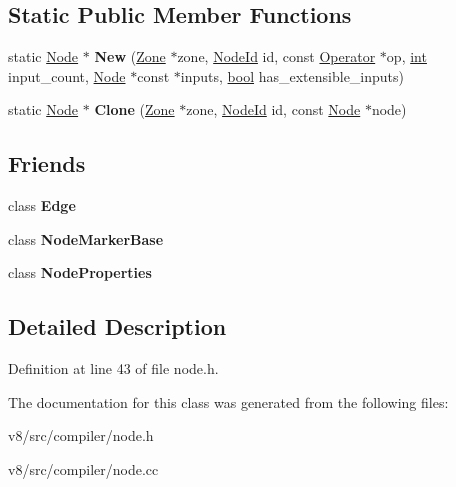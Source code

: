 \subsection*{Static Public Member Functions}
\begin{DoxyCompactItemize}
\item 
\mbox{\label{classv8_1_1internal_1_1compiler_1_1Node_a06bd4ebd8efe2f071787e5f21e7f5b49}} 
static \mbox{\hyperlink{classv8_1_1internal_1_1compiler_1_1Node}{Node}} $\ast$ {\bfseries New} (\mbox{\hyperlink{classv8_1_1internal_1_1Zone}{Zone}} $\ast$zone, \mbox{\hyperlink{classuint32__t}{Node\+Id}} id, const \mbox{\hyperlink{classv8_1_1internal_1_1compiler_1_1Operator}{Operator}} $\ast$op, \mbox{\hyperlink{classint}{int}} input\+\_\+count, \mbox{\hyperlink{classv8_1_1internal_1_1compiler_1_1Node}{Node}} $\ast$const $\ast$inputs, \mbox{\hyperlink{classbool}{bool}} has\+\_\+extensible\+\_\+inputs)
\item 
\mbox{\label{classv8_1_1internal_1_1compiler_1_1Node_a128b2d37dbcf38bb667390f45925a1a7}} 
static \mbox{\hyperlink{classv8_1_1internal_1_1compiler_1_1Node}{Node}} $\ast$ {\bfseries Clone} (\mbox{\hyperlink{classv8_1_1internal_1_1Zone}{Zone}} $\ast$zone, \mbox{\hyperlink{classuint32__t}{Node\+Id}} id, const \mbox{\hyperlink{classv8_1_1internal_1_1compiler_1_1Node}{Node}} $\ast$node)
\end{DoxyCompactItemize}
\subsection*{Friends}
\begin{DoxyCompactItemize}
\item 
\mbox{\label{classv8_1_1internal_1_1compiler_1_1Node_ad2c8ba04c9d9989ccbf3c5aba267a3d7}} 
class {\bfseries Edge}
\item 
\mbox{\label{classv8_1_1internal_1_1compiler_1_1Node_a300aff091dd808ac2a77b73336b03672}} 
class {\bfseries Node\+Marker\+Base}
\item 
\mbox{\label{classv8_1_1internal_1_1compiler_1_1Node_a455dfadd6114e8214b66e252ceeac436}} 
class {\bfseries Node\+Properties}
\end{DoxyCompactItemize}


\subsection{Detailed Description}


Definition at line 43 of file node.\+h.



The documentation for this class was generated from the following files\+:\begin{DoxyCompactItemize}
\item 
v8/src/compiler/node.\+h\item 
v8/src/compiler/node.\+cc\end{DoxyCompactItemize}
